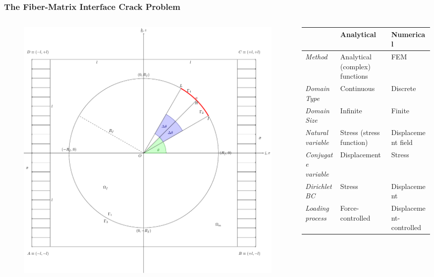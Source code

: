 \documentclass[first,firstsupp,lastsupp,handout,last,hyperref,table]{ETHclass}
\begin{document}
\begin{frame}
\frametitle{\small The Fiber-Matrix Interface Crack Problem}
\vspace{-0.5cm}
\centering
\begin{columns}
\begin{column}{0.4\textwidth}
\begin{figure}
\includegraphics[width=\columnwidth]{fiberMatrixInterfaceProblem.pdf}
  \label{fig:jintegral}
\end{figure}
\end{column}
\begin{column}{0.6\textwidth}
\footnotesize
\begin{table}
\begin{tabularx}{\columnwidth}{XXX}
&{\tiny \bf{Analytical}}&{\tiny \bf{Numerical}}\\
\midrule
{\tiny \textit{Method}}&{\tiny Analytical (complex) functions}&{\tiny FEM}\\
\midrule
{\tiny \textit{Domain Type}}&{\tiny Continuous}&{\tiny Discrete}\\
{\tiny \textit{Domain Size}}&{\tiny Infinite}&{\tiny Finite}\\
\midrule
{\tiny \textit{Natural variable}}&{\tiny Stress (stress function)}&{\tiny Displacement field}\\
{\tiny \textit{Conjugate variable}}&{\tiny Displacement}&{\tiny Stress}\\
\midrule
{\tiny \textit{Dirichlet BC}}&{\tiny Stress}&{\tiny Displacement}\\
{\tiny \textit{Loading process}}&{\tiny Force-controlled}&{\tiny Displacement-controlled}\\
\end{tabularx}
\end{table}
\end{column}
\end{columns}
\end{frame}
\end{document}
